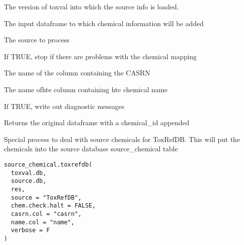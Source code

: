 \documentclass[letterpaper]{book}
\begin{document}
%
\begin{Arguments}
\begin{ldescription}
\item[\code{db}] The version of toxval into which the source info is loaded.

\item[\code{res}] The input dataframe to which chemical information will be added

\item[\code{source}] The source to process

\item[\code{chem.check.halt}] If TRUE, stop if there are problems with the chemical mapping

\item[\code{casrn.col}] The name of the column containing the CASRN

\item[\code{name.col}] The name ofhte column containing hte chemical name

\item[\code{verbose}] If TRUE, write out diagnostic messages
\end{ldescription}
\end{Arguments}
%
\begin{Value}
Returns the original dataframe with a chemical\_id appended
\end{Value}
%
\begin{Description}\relax
Special process to deal with source chemicals for ToxRefDB. This will put the
chemicals into the source database source\_chemical table
\end{Description}
%
\begin{Usage}
\begin{verbatim}
source_chemical.toxrefdb(
  toxval.db,
  source.db,
  res,
  source = "ToxRefDB",
  chem.check.halt = FALSE,
  casrn.col = "casrn",
  name.col = "name",
  verbose = F
)
\end{verbatim}
\end{Usage}
%
\end{document}
